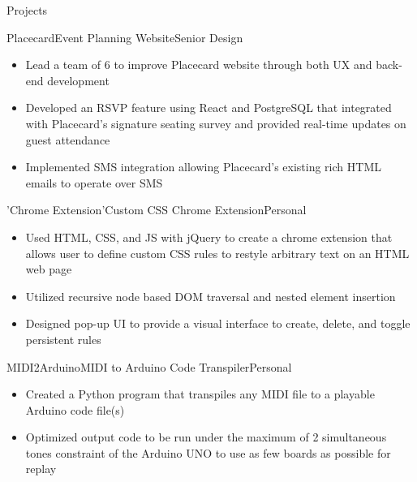 \documentclass{resume} %
\begin{document}
\begin{rSection}{Projects}
\begin{rSubsection}{Placecard}{}{Event Planning Website}{Senior Design}
\item[]\renewcommand\labelitemi{$\vcenter{\hbox{\tiny$\bullet$}}$} \begin{itemize}
   \item Lead a team of 6 to improve Placecard website through both UX and back-end development
   \vspace{-1mm}
   \item Developed an RSVP feature using React and PostgreSQL that integrated with Placecard's signature seating survey and provided real-time updates on guest attendance
   \vspace{-1mm}
   \item Implemented SMS integration allowing Placecard's existing rich HTML emails to operate over SMS
   
\end{itemize}
\end{rSubsection}
\begin{rSubsection}{'Chrome Extension'}{}{Custom CSS Chrome Extension}{Personal}
\item[]\renewcommand\labelitemi{$\vcenter{\hbox{\tiny$\bullet$}}$} \begin{itemize}
   \item Used HTML, CSS, and JS with jQuery to create a chrome extension that allows user to define custom CSS rules to restyle arbitrary text on an HTML web page
   \vspace{-1mm}
   \item Utilized recursive node based DOM traversal and nested element insertion 
   \vspace{-1mm}
   \item Designed pop-up UI to provide a visual interface to create, delete, and toggle persistent rules 
\end{itemize}
\end{rSubsection}
\begin{rSubsection}{MIDI2Arduino}{}{MIDI to Arduino Code Transpiler}{Personal}
\item[]\renewcommand\labelitemi{$\vcenter{\hbox{\tiny$\bullet$}}$} \begin{itemize}
   \item Created a Python program that transpiles any MIDI file to a playable Arduino code file(s)
   \vspace{-1mm}
   \item Optimized output code to be run under the maximum of 2 simultaneous tones constraint of the Arduino UNO to use as few boards as possible for replay
\end{itemize}
\end{rSubsection}

\vspace{-1mm}
\end{rSection}
\vspace{-1mm}
\end{document}

